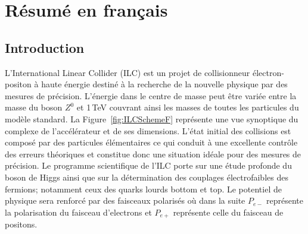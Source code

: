 \section{R\'esum\'e en fran\c cais}

\renewcommand{\sm}{modèle standard}
\renewcommand{\bsm}{au delà du modèle standard}
\subsection*{Introduction}


L'International Linear Collider \cite{bib:ILC} (ILC) est un projet de collisionneur électron-positon à haute énergie destiné à la recherche de la nouvelle physique par des mesures de précision.
L’énergie dans le centre de masse peut être variée entre la masse du boson $Z^0$ et 1\,TeV couvrant ainsi les masses de toutes les particules du modèle standard. 
La Figure~\ref{fig:ILCSchemeF} représente une vue synoptique du complexe de l’accélérateur et de ses dimensions. 
L’état initial des collisions est composé par des particules élémentaires ce qui conduit à une excellente contrôle des erreurs théoriques et constitue donc une situation idéale pour des mesures de précision. 
Le programme scientifique de l'ILC porte sur une étude profonde du boson de Higgs ainsi que sur la détermination des couplages électrofaibles des fermions; notamment ceux des quarks lourds bottom et top. Le potentiel de physique sera renforcé par des faisceaux polarisés où dans la suite $P_{e-}$ représente la polarisation du faisceau d’electrons et $P_{e+}$ représente celle du faisceau de positons.



